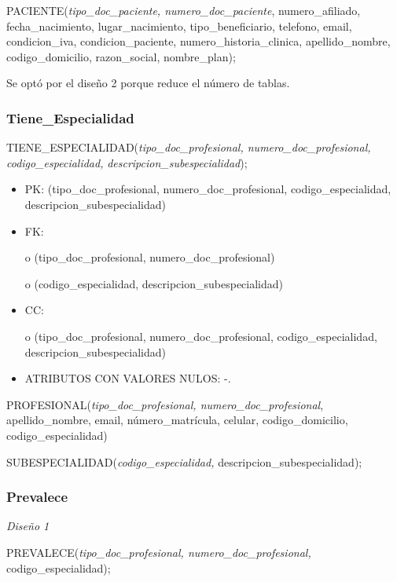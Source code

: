 \documentclass[a4paper,11pt]{article}
\begin{document}
PACIENTE(\emph{tipo\_doc\_paciente, numero\_doc\_paciente}, numero\_afiliado, fecha\_nacimiento, 
lugar\_nacimiento, tipo\_beneficiario, telefono, email, condicion\_iva, condicion\_paciente, 
numero\_historia\_clinica, apellido\_nombre, codigo\_domicilio, razon\_social, 
 nombre\_plan);

Se optó por el diseño 2 porque reduce el número de tablas.\label{HToc293405844}

\subsubsection{\textbf{Tiene\_Especialidad}}

TIENE\_ESPECIALIDAD(\emph{tipo\_doc\_profesional, numero\_doc\_profesional, codigo\_especialidad,} 
\emph{descripcion\_subespecialidad});

\begin{itemize}
\item PK: (tipo\_doc\_profesional, numero\_doc\_profesional, codigo\_especialidad, 
descripcion\_subespecialidad)

\item FK: 

o (tipo\_doc\_profesional, numero\_doc\_profesional)

o (codigo\_especialidad, descripcion\_subespecialidad)

\item CC:

o (tipo\_doc\_profesional, numero\_doc\_profesional, codigo\_especialidad, descripcion\_subespecialidad)

\item ATRIBUTOS CON VALORES NULOS:  -.
\end{itemize}

PROFESIONAL(\emph{tipo\_doc\_profesional, numero\_doc\_profesional}, apellido\_nombre, 
email, número\_matrícula, celular,\textit{\textbf{ }}codigo\_domicilio, codigo\_especialidad)

SUBESPECIALIDAD(\emph{codigo\_especialidad, }descripcion\_subespecialidad);\label{HToc293405845}

\subsubsection{\textbf{Prevalece}}

\textit{Diseño 1}

PREVALECE(\emph{tipo\_doc\_profesional, numero\_doc\_profesional}\textit{, }codigo\_especialidad);
\end{document}
